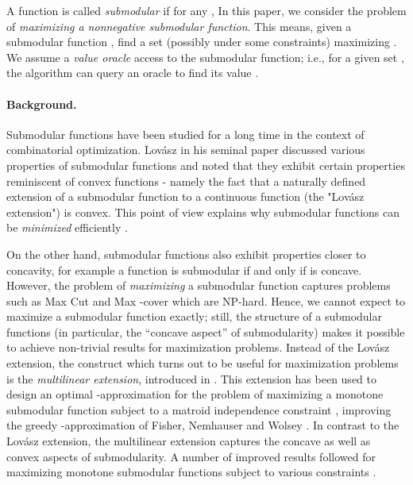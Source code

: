 \documentclass{article}[11pt]
\begin{document}
A function  is called {\em submodular} if for any ,
 In this paper,
we consider the problem of {\em maximizing a nonnegative submodular function}.
This means, given a submodular function , find
a set  (possibly under some constraints) maximizing .
We assume a {\em value oracle} access to the submodular function; i.e., for a given set ,
the algorithm can query an oracle to find its value .

\paragraph{Background.}
Submodular functions have been studied for a long time in the context of combinatorial
optimization.
Lov\'asz in his seminal paper \cite{Lovasz83} discussed various properties
of submodular functions and noted that they exhibit certain properties
reminiscent of convex functions - namely the fact that a naturally defined extension
of a submodular function to a continuous function (the "Lov\'asz extension") is convex. 
This point of view explains why submodular functions can be {\em minimized}
efficiently \cite{GLS81,FFI00,Schrijver00}.

On the other hand, submodular functions also exhibit properties closer to concavity,
for example a function  is submodular if and only if  is concave.
However, the problem of {\em maximizing} a submodular function captures
problems such as Max Cut \cite{GW95} and Max -cover \cite{Feige98} which are NP-hard.
Hence, we cannot expect to maximize a submodular function exactly;
still, the structure of a submodular functions (in particular, the ``concave aspect''
of submodularity) makes it possible to achieve non-trivial results for maximization problems.
Instead of the Lov\'asz extension, the construct which turns out to be useful for maximization
problems is the {\em multilinear extension}, introduced in \cite{CCPV07}. 
This extension has been used to design an optimal -approximation for the
problem of maximizing a monotone submodular function subject to a matroid independence
constraint \cite{Vondrak08,CCPV09}, improving the greedy -approximation of
Fisher, Nemhauser and Wolsey \cite{NWF78II}.
In contrast to the Lov\'asz extension,
the multilinear extension captures the concave as well as convex aspects of submodularity.
A number of improved results followed for maximizing monotone submodular functions subject
to various constraints \cite{KST09,LMNS09,LSV09,CVZ10}.
\end{document}
